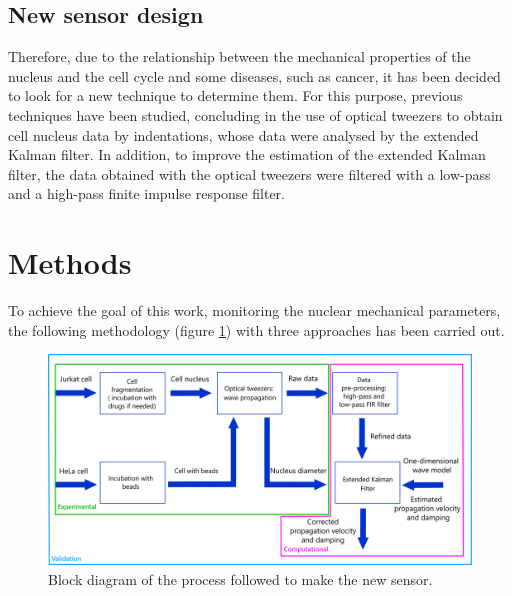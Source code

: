 \documentclass[12pt, a4paper]{article} %
\begin{document}
\setlength{\parskip}{0mm}

\subsection{New sensor design}

Therefore, due to the relationship between the mechanical properties of the nucleus and the cell cycle and some diseases, such as cancer, it has been decided to look for a new technique to determine them. For this purpose, previous techniques have been studied, concluding in the use of optical tweezers to obtain cell nucleus data by indentations, whose data were analysed by the extended Kalman filter. In addition, to improve the estimation of the extended Kalman filter, the data obtained with the optical tweezers were filtered with a low-pass and a high-pass finite impulse response filter.
 
\setlength{\parskip}{4mm}

\newpage
\setlength{\parskip}{0mm}

\section{Methods}

To achieve the goal of this work, monitoring the nuclear mechanical parameters, the following methodology (figure \ref{fig:esquema_trabajo}) with three approaches has been carried out.

\setlength{\parskip}{4mm}

\begin{figure}[htbp]
  \centering
  \includegraphics[width=1\textwidth]{figures/esquema_trabajo_metodos_2.png}
  \caption{Block diagram of the process followed to make the new sensor.}
  \label{fig:esquema_trabajo}
\end{figure}
\end{document}
